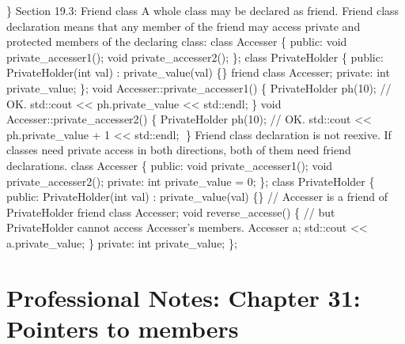 \} Section 19.3: Friend class A whole class may be declared as friend.
Friend class declaration means that any member of the friend may access
private and protected members of the declaring class: class Accesser \{
public: void private\_accesser1(); void private\_accesser2(); \}; class
PrivateHolder \{ public: PrivateHolder(int val) : private\_value(val)
\{\} friend class Accesser; private: int private\_value; \}; void
Accesser::private\_accesser1() \{ PrivateHolder ph(10); // OK. std::cout
\textless\textless{} ph.private\_value \textless\textless{} std::endl;
\} void Accesser::private\_accesser2() \{ PrivateHolder ph(10); // OK.
std::cout \textless\textless{} ph.private\_value + 1
\textless\textless{} std::endl; \} Friend class declaration is not
reexive. If classes need private access in both directions, both of them
need friend declarations. class Accesser \{ public: void
private\_accesser1(); void private\_accesser2(); private: int
private\_value = 0; \}; class PrivateHolder \{ public: PrivateHolder(int
val) : private\_value(val) \{\} // Accesser is a friend of PrivateHolder
friend class Accesser; void reverse\_accesse() \{ // but PrivateHolder
cannot access Accesser's members. Accesser a; std::cout
\textless\textless{} a.private\_value; \} private: int private\_value;
\};

\hypertarget{professional-notes-chapter-31-pointers-to-members-1}{%
\section{Professional Notes: Chapter 31: Pointers to
members}\label{professional-notes-chapter-31-pointers-to-members-1}}

